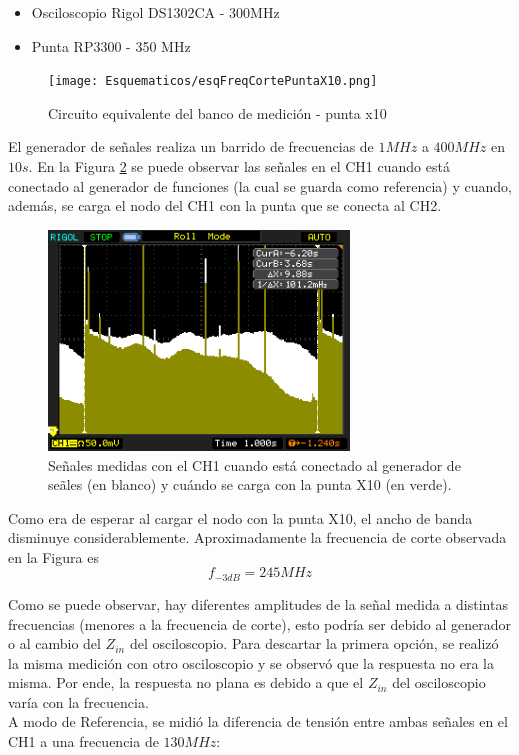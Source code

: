 \documentclass[a4paper,10pt]{article}
\begin{document}
		\begin{itemize}
			\item Osciloscopio Rigol DS1302CA - 300MHz
			\item Punta RP3300 - 350 MHz
		\end{itemize}

		\begin{figure}[!htb]
			\centering
			\texttt{[image: Esquematicos/esqFreqCortePuntaX10.png]}
			\caption{Circuito equivalente del banco de medición - punta x10} 
			\label{esq001}
		\end{figure}

		\indent El generador de se\~nales realiza un barrido de frecuencias de
		$1MHz$ a $400MHz$ en $10s$. En la Figura \ref{img001} se puede 
		observar las se\~nales en el CH1 cuando est\'a conectado al 
		generador de funciones (la cual se guarda como referencia) y cuando, 
		adem\'as, se carga el nodo del CH1 con la punta que se conecta al CH2.
		
		\begin{figure}[!htb]
			\centering
			\includegraphics[width=8cm]
			{Imagenes/Mediciones instrumentos/NewFile1.png}
			\caption{Se\~nales medidas con el CH1 cuando est\'a conectado al 
			generador de se\~ales (en blanco) y cu\'ando se carga con la punta
			X10 (en verde).} \label{img001}
		\end{figure}
			
		\indent Como era de esperar al cargar el nodo con la punta X10, el 
		ancho de banda disminuye considerablemente. Aproximadamente la 
		frecuencia de corte observada en la Figura es $$f_{-3dB}=245MHz$$

		\indent Como se puede observar, hay diferentes amplitudes de la señal
		medida a distintas frecuencias (menores a la frecuencia de corte), 
		esto podría ser debido al generador o al cambio del $Z_{in}$ del 
		osciloscopio. Para descartar la primera opción, se realizó la misma
		medición con otro osciloscopio y se observó que la respuesta no era la
		misma. Por ende, la respuesta no plana es debido a que el $Z_{in}$ del
		osciloscopio varía con la frecuencia.\\
		\indent A modo de Referencia, se midió la diferencia de tensión entre
		ambas señales en el CH1 a una frecuencia de $130MHz$:
\end{document}
